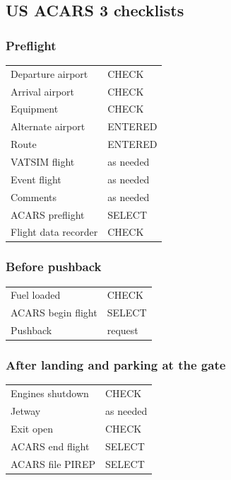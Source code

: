 \documentclass[12pt]{article}
\begin{document}
\subsection{US ACARS 3 checklists}

\subsubsection*{Preflight}
\begin{tabular}{ll}
Departure airport & CHECK\\
Arrival airport & CHECK\\
Equipment & CHECK\\
Alternate airport & ENTERED\\
Route & ENTERED\\
VATSIM flight & as needed\\
Event flight & as needed\\
Comments & as needed\\
ACARS preflight & SELECT\\
Flight data recorder & CHECK\\
\end{tabular}

\subsubsection*{Before pushback}
\begin{tabular}{ll}
Fuel loaded & CHECK\\
ACARS begin flight & SELECT\\
Pushback & request\\
\end{tabular}

\subsubsection*{After landing and parking at the gate}
\begin{tabular}{ll}
Engines shutdown & CHECK\\
Jetway & as needed\\
Exit open & CHECK\\
ACARS end flight & SELECT\\
ACARS file PIREP & SELECT\\
\end{tabular}
\end{document}
